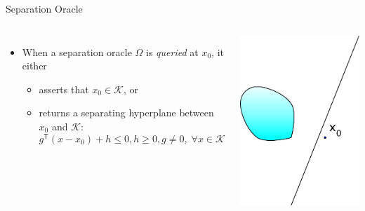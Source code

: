 \documentclass[10pt,ignorenonframetext,serif,onlymath]{beamer}
\providecommand{\tightlist}{%
  \setlength{\itemsep}{0pt}\setlength{\parskip}{0pt}}
\begin{document}
\begin{frame}{Separation Oracle}
\protect\hypertarget{separation-oracle}{}

\begin{columns}


\begin{itemize}
\tightlist
\item
  When a separation oracle \(\Omega\) is \emph{queried} at \(x_0\), it
  either

  \begin{itemize}
  \tightlist
  \item
    asserts that \(x_0 \in \mathcal{K}\), or
  \item
    returns a separating hyperplane between \(x_0\) and \(\mathcal{K}\):
    \[g^\mathsf{T} (x - x_0) + h \leq 0, h \geq 0, g \neq 0, \;
          \forall x \in \mathcal{K}\]
  \end{itemize}
\end{itemize}


\includegraphics{ellipsoid.files/cut.pdf}

\end{columns}

\end{frame}
\end{document}
